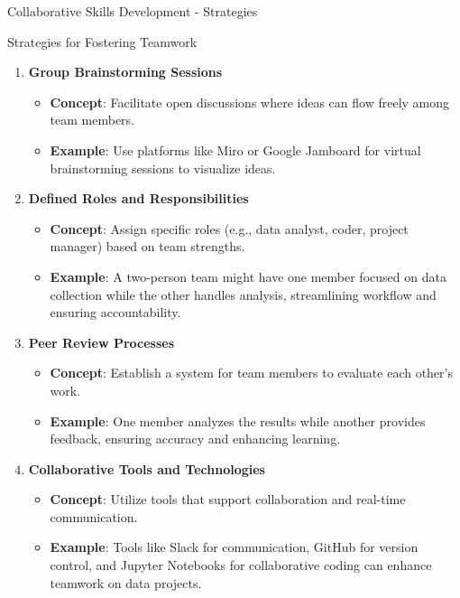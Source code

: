 \documentclass[aspectratio=169]{beamer}
\begin{document}
\begin{frame}[fragile]{Collaborative Skills Development - Strategies}
    \begin{block}{Strategies for Fostering Teamwork}
        \begin{enumerate}
            \item \textbf{Group Brainstorming Sessions}
                \begin{itemize}
                    \item \textbf{Concept}: Facilitate open discussions where ideas can flow freely among team members.
                    \item \textbf{Example}: Use platforms like Miro or Google Jamboard for virtual brainstorming sessions to visualize ideas.
                \end{itemize}
            \item \textbf{Defined Roles and Responsibilities}
                \begin{itemize}
                    \item \textbf{Concept}: Assign specific roles (e.g., data analyst, coder, project manager) based on team strengths.
                    \item \textbf{Example}: A two-person team might have one member focused on data collection while the other handles analysis, streamlining workflow and ensuring accountability.
                \end{itemize}
            \item \textbf{Peer Review Processes}
                \begin{itemize}
                    \item \textbf{Concept}: Establish a system for team members to evaluate each other's work.
                    \item \textbf{Example}: One member analyzes the results while another provides feedback, ensuring accuracy and enhancing learning.
                \end{itemize}
            \item \textbf{Collaborative Tools and Technologies}
                \begin{itemize}
                    \item \textbf{Concept}: Utilize tools that support collaboration and real-time communication.
                    \item \textbf{Example}: Tools like Slack for communication, GitHub for version control, and Jupyter Notebooks for collaborative coding can enhance teamwork on data projects.

\end{itemize}
\end{enumerate}
\end{block}
\end{frame}
\end{document}
